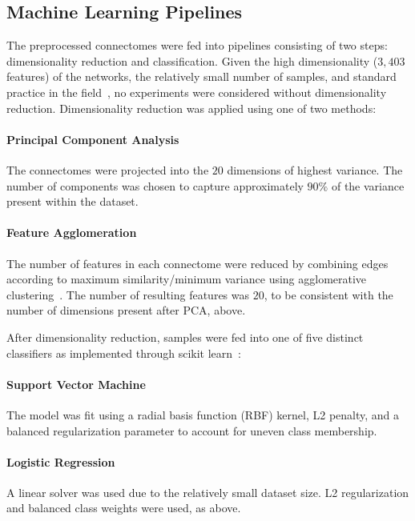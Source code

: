 \documentclass[10pt]{SelfArx} %
\newcommand{\new}[1]{\color{blue}#1\color{black}\xspace}
\begin{document}
\subsection*{Machine Learning Pipelines}

The preprocessed connectomes were fed into pipelines consisting of two steps: dimensionality reduction and
classification. \new{Given the high dimensionality ($3,403$ features) of the networks, the relatively small number of
samples, and standard practice in the field~\cite{Payabvash2019-tm,Park2015-uj,weis2020sex}, no experiments were
considered without dimensionality reduction.} Dimensionality reduction was applied using one of two methods:

\paragraph{Principal Component Analysis} The connectomes were projected into the $20$ dimensions of highest variance.
The number of components was chosen to capture approximately $90\%$ of the variance present within the dataset.

\paragraph{Feature Agglomeration} The number of features in each connectome were reduced by combining edges according
to maximum similarity/minimum variance using agglomerative clustering~\cite{Ward1963-uh}. The number of resulting
features was $20$, to be consistent with the number of dimensions present after PCA, above.

After dimensionality reduction, samples were fed into one of five distinct classifiers as implemented through scikit
learn~\cite{Pedregosa2011-uz}:

\paragraph{Support Vector Machine} The model was fit using a radial basis function (RBF) kernel, L2 penalty, and a
balanced regularization parameter to account for uneven class membership.

\paragraph{Logistic Regression} A linear solver was used due to the relatively small dataset size. L2 regularization
and balanced class weights were used, as above.
\end{document}
